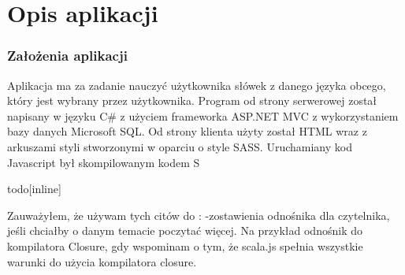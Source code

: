 {\let\cleardoublepage\relax \chapter{Opis aplikacji}}
\label{cha:main}

\subsection{Założenia aplikacji}

Aplikacja ma za zadanie nauczyć użytkownika słówek z danego języka obcego, który jest wybrany przez użytkownika. Program od strony serwerowej został napisany w języku C\# z użyciem frameworka ASP.NET MVC z wykorzystaniem bazy danych Microsoft SQL. Od strony klienta użyty został HTML wraz z arkuszami styli stworzonymi w oparciu o style SASS. Uruchamiany kod Javascript był skompilowanym kodem S %


todo[inline]{
Zauważyłem, że używam tych citów do :
-zostawienia odnośnika dla czytelnika, jeśli chciałby o danym temacie poczytać więcej. Na przykład odnośnik do kompilatora Closure, gdy wspominam o tym, że scala.js spełnia wszystkie warunki do użycia kompilatora closure.

}